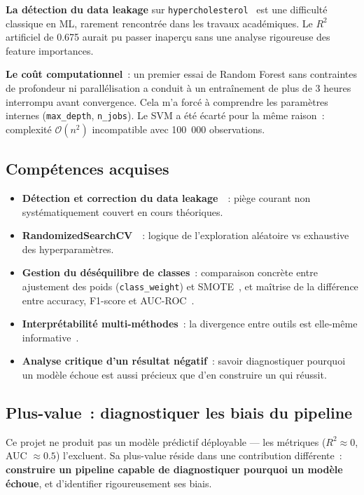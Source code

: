 \textbf{La détection du data leakage} sur \texttt{hypercholesterol}~\cite{kaufman2012} est une difficulté classique en ML, rarement rencontrée dans les travaux académiques. Le $R^2$ artificiel de 0.675 aurait pu passer inaperçu sans une analyse rigoureuse des feature importances.

\textbf{Le coût computationnel}~: un premier essai de Random Forest sans contraintes de profondeur ni parallélisation a conduit à un entraînement de plus de 3 heures interrompu avant convergence. Cela m'a forcé à comprendre les paramètres internes (\texttt{max\_depth}, \texttt{n\_jobs}). Le SVM a été écarté pour la même raison~: complexité $\mathcal{O}(n^2)$ incompatible avec 100~000 observations.

\subsection{Compétences acquises}

\begin{itemize}
  \item \textbf{Détection et correction du data leakage}~\cite{kaufman2012}~: piège courant non systématiquement couvert en cours théoriques.
  \item \textbf{RandomizedSearchCV}~\cite{bergstra2012}~: logique de l'exploration aléatoire vs exhaustive des hyperparamètres.
  \item \textbf{Gestion du déséquilibre de classes}~: comparaison concrète entre ajustement des poids (\texttt{class\_weight}) et SMOTE~\cite{chawla2002}, et maîtrise de la différence entre accuracy, F1-score et AUC-ROC~\cite{sokolova2009}.
  \item \textbf{Interprétabilité multi-méthodes}~: la divergence entre outils est elle-même informative~\cite{rudin2019}.
  \item \textbf{Analyse critique d'un résultat négatif}~: savoir diagnostiquer pourquoi un modèle échoue est aussi précieux que d'en construire un qui réussit.
\end{itemize}

\subsection{Plus-value~: diagnostiquer les biais du pipeline}

Ce projet ne produit pas un modèle prédictif déployable --- les métriques ($R^2 \approx 0$, AUC $\approx 0.5$) l'excluent. Sa plus-value réside dans une contribution différente~: \textbf{construire un pipeline capable de diagnostiquer pourquoi un modèle échoue}, et d'identifier rigoureusement ses biais.

